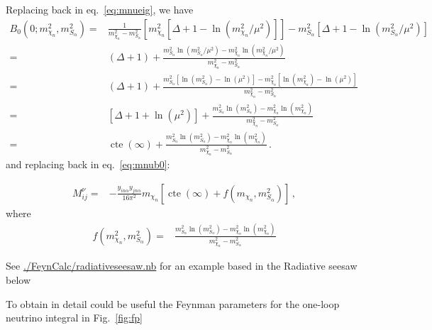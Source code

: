 Replacing back in eq.~\eqref{eq:mnueig}, we have
\begin{align}
   B_0 \left(0;m_{\chi_n}^2,m^2_{S_{\alpha}} \right)=&
   \frac{1}{m_{\chi_n}^2-m_{S_\alpha}^2}\left[m^2_{\chi_n} \left[ \Delta+1-\ln \left( m_{\chi_n}^2/\mu^2 \right) \right]  \right] 
-m_{S_\alpha}^2 \left[ \Delta+1-\ln \left( m_{S_\alpha}^2/\mu^2 \right) \right] \nonumber\\
  =&(\Delta+1)+\frac{m_{S_\alpha}^2\ln \left( m_{S_\alpha}^2/\mu^2 \right)-m_{\chi_n}^2\ln \left( m_{\chi_n}^2/\mu^2 \right)}{m_{\chi_n}^2-m_{S_\alpha}^2} \nonumber\\
 =&(\Delta+1)+\frac{m_{S_\alpha}^2 \left[ \ln \left( m_{S_\alpha}^2 \right)-\ln \left( \mu^2 \right) \right]-
     m_{\chi_n}^2 \left[ \ln \left( m_{\chi_n}^2 \right)-\ln \left( \mu^2 \right) \right]}{m_{\chi_n}^2-m_{S_\alpha}^2} \nonumber\\  
=&\left[\Delta+1+\ln\left( \mu^2 \right) \right]+\frac{m_{S_\alpha}^2\ln \left( m_{S_\alpha}^2 \right)-m_{\chi_n}^2\ln \left( m_{\chi_n}^2 \right)}{m_{\chi_n}^2-m_{S_\alpha}^2} \nonumber\\
=&\operatorname{cte}(\infty)+\frac{m_{S_\alpha}^2\ln \left( m_{S_\alpha}^2 \right)-m_{\chi_n}^2\ln \left( m_{\chi_n}^2 \right)}{m_{\chi_n}^2-m_{S_\alpha}^2} \,.
\end{align}
and replacing back in eq.~\eqref{eq:mnub0}:

\begin{align}
 M^{\nu}_{ij}=&-\frac{y_{i n\alpha}y_{j n\alpha}}{16\pi^2}m_{\chi_n} \left[ \operatorname{cte}(\infty)+
f \left( m_{\chi_n},m_{S_{\alpha}}^2 \right) \right] \,,
\end{align}
where
\begin{align}
f \left( m_{\chi_n}^2,m_{S_{\alpha}}^2 \right)=&  
\frac{m_{S_{\alpha}}^2\ln \left(m_{S_{\alpha}}^2\right)-m_{\chi_n}^2\ln \left(m_{\chi_n}^2  \right)}{m_{\chi_n}^2-m_{S_{\alpha}}^2}
\end{align}

See \url{./FeynCalc/radiativeseesaw.nb} for an example based in the Radiative seesaw below


To obtain in detail could be useful the Feynman parameters for the one-loop neutrino integral in Fig.~\ref{fig:fp}




